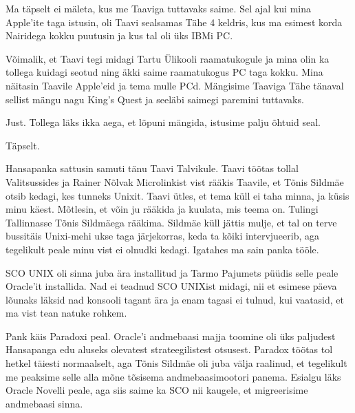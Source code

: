 
Ma täpselt ei mäleta, kus me Taaviga tuttavaks saime. 
Sel ajal kui mina Apple'ite taga istusin, oli Taavi sealsamas Tähe 
4 keldris, kus ma esimest korda Nairidega kokku puutusin ja kus tal oli üks
IBMi PC.

Võimalik, et Taavi tegi midagi Tartu Ülikooli raamatukogule ja mina olin ka tollega kuidagi seotud ning äkki saime
raamatukogus PC taga kokku. Mina näitasin Taavile Apple'eid 
ja tema mulle PCd. Mängisime Taaviga Tähe tänaval sellist mängu nagu King's 
Quest ja seeläbi saimegi paremini tuttavaks.


Just. Tollega läks ikka aega, et lõpuni mängida, istusime palju õhtuid 
seal.


Täpselt. 


Hansapanka sattusin samuti tänu Taavi Talvikule. 
Taavi töötas tollal Valitsussides ja 
Rainer Nõlvak Microlinkist vist 
rääkis Taavile, et Tõnis Sildmäe otsib kedagi, kes tunneks Unixit. Taavi ütles, et tema küll ei taha 
minna, ja küsis minu käest. Mõtlesin, et võin ju rääkida ja 
kuulata, mis teema on. Tulingi Tallinnasse Tõnis Sildmäega rääkima. 
Sildmäe küll jättis mulje, et tal on terve bussitäis Unixi-mehi ukse taga 
järjekorras, keda ta kõiki intervjueerib, aga tegelikult peale minu vist
ei olnudki kedagi. Igatahes ma sain panka tööle.

SCO UNIX oli sinna juba ära installitud ja Tarmo 
Pajumets püüdis selle peale Oracle'it 
installida. Nad ei teadnud SCO UNIXist midagi, nii et esimese 
päeva lõunaks läksid nad konsooli tagant ära ja enam
tagasi ei tulnud, kui vaatasid, et ma vist tean natuke rohkem.


Pank käis Paradoxi peal. Oracle'i andmebaasi majja 
toomine oli üks paljudest Hansapanga edu aluseks olevatest 
strateegilistest otsusest. Paradox 
töötas tol hetkel täiesti normaalselt, aga Tõnis 
Sildmäe oli juba välja raalinud, et tegelikult me 
peaksime selle alla mõne tõsisema andmebaasimootori panema. 
Esialgu läks Oracle Novelli peale, aga siis saime ka SCO 
nii kaugele, et migreerisime andmebaasi sinna.

